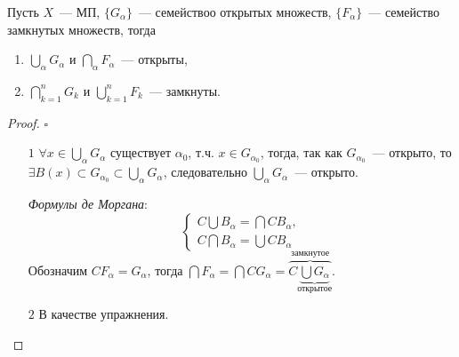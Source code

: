 \begin{theorem}
  Пусть $X$~--- МП, $\{G_\alpha\}$~--- семействоо открытых множеств, $\{ F_\alpha\}$~--- семейство замкнутых множеств, тогда
  \begin{enumerate}
    \item $\bigcup\limits_{\alpha} G_\alpha$ и $\bigcap\limits_{\alpha} F_\alpha$~--- открыты,
    \item $\bigcap\limits_{k=1}^n G_k$ и $\bigcup\limits_{k=1}^n F_k$~--- замкнуты.
  \end{enumerate}
\end{theorem}
\begin{proof}  \href{https://youtu.be/r2DT_f552TA?t=2798}{$\square$}
  
  \begin{enumerate}
    \item[$\boxed{1}$] $\forall x \in \bigcup\limits_{\alpha} G_\alpha$ существует $\alpha_0$, т.ч. $x \in G_{\alpha_0}$, 
    тогда, так как $G_{\alpha_0}$~--- открыто, то $\exists B(x) \subset G_{\alpha_0} \subset \bigcup\limits_{\alpha} G_\alpha$,  следовательно $\bigcup\limits_{\alpha} G_\alpha$~--- открыто.

    \emph{Формулы де Моргана}:
    \begin{equation}
      \begin{cases}
        C \bigcup B_\alpha = \bigcap C B_\alpha,\\
        C \bigcap B_\alpha = \bigcup C B_\alpha
      \end{cases}
    \end{equation}
    Обозначим $C F_\alpha = G_\alpha$, тогда $\bigcap F_\alpha = \bigcap C G_\alpha = \overbrace{C \underbrace{\bigcup G_\alpha}_{\text{открытое}}}^{\text{замкнутое}}$.

    \item[$\boxed{2}$] В качестве упражнения.
  \end{enumerate}
\end{proof}









